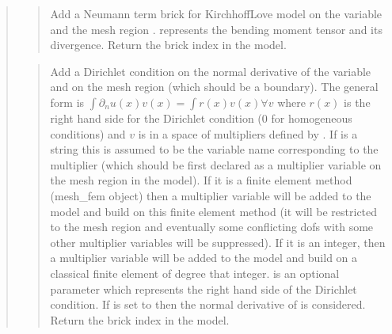 \documentclass[a4paper,11pt,english]{sphinxmanual}
\begin{document}
\begin{quote}
\begin{quote}
Add a Neumann term brick for Kirchhoff\sphinxhyphen{}Love model
on the variable  and the mesh region .
 represents the bending moment tensor and  
its divergence.
Return the brick index in the model.
\end{quote}

\begin{quote}

Add a Dirichlet condition on the normal derivative of the variable
 and on the mesh region  (which should be a boundary).
The general form is
\(\int \partial_n u(x)v(x) = \int r(x)v(x) \forall v\)
where \(r(x)\) is
the right hand side for the Dirichlet condition (0 for
homogeneous conditions) and \(v\) is in a space of multipliers
defined by .
If  is a string this is assumed
to be the variable name corresponding to the multiplier (which should be
first declared as a multiplier variable on the mesh region in the model).
If it is a finite element method (mesh\_fem object) then a multiplier
variable will be added to the model and build on this finite element
method (it will be restricted to the mesh region  and eventually
some conflicting dofs with some other multiplier variables will be
suppressed). If it is an integer, then a  multiplier variable will be
added to the model and build on a classical finite element of degree
that integer.  is an optional parameter which represents
the right hand side of the Dirichlet condition.
If  is set to  then the normal
derivative of  is considered.
Return the brick index in the model.
\end{quote}

\begin{quote}


\end{quote}
\end{quote}
\end{document}
